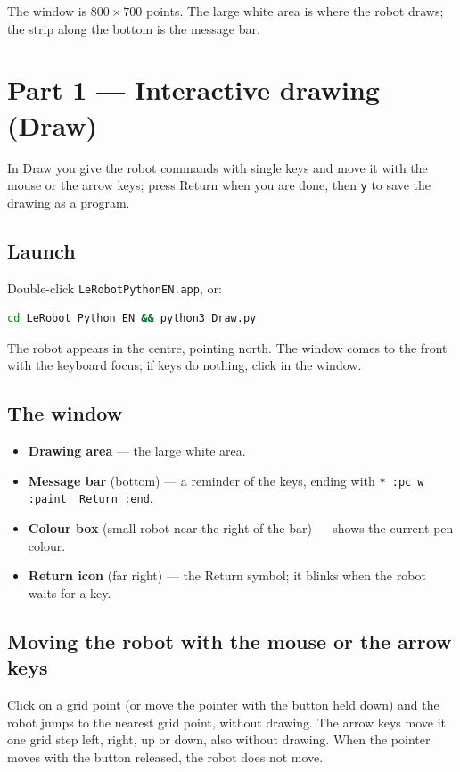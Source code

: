 \documentclass[11pt,a4paper]{article}
\newcommand{\kbd}[1]{\texttt{#1}}
\begin{document}
The window is $800 \times 700$ points. The large white area is where the
robot draws; the strip along the bottom is the message bar.

\section{Part 1 --- Interactive drawing (Draw)}

In Draw you give the robot commands with single keys and move it with
the mouse or the arrow keys; press Return when you are done, then \kbd{y} to
save the drawing as a program.

\subsection{Launch}
Double-click \kbd{LeRobotPythonEN.app}, or:
\begin{lstlisting}[language=bash]
cd LeRobot_Python_EN && python3 Draw.py
\end{lstlisting}
The robot appears in the centre, pointing north. The window comes to the
front with the keyboard focus; if keys do nothing, click in the window.

\subsection{The window}
\begin{itemize}
\item \textbf{Drawing area} --- the large white area.
\item \textbf{Message bar} (bottom) --- a reminder of the keys, ending with
  \kbd{* :pc w :paint\ \ Return :end}.
\item \textbf{Colour box} (small robot near the right of the bar) --- shows
  the current pen colour.
\item \textbf{Return icon} (far right) --- the Return symbol; it blinks when
  the robot waits for a key.
\end{itemize}

\subsection{Moving the robot with the mouse or the arrow keys}
Click on a grid point (or move the pointer with the button held down) and
the robot jumps to the nearest grid point, without drawing. The arrow keys
move it one grid step left, right, up or down, also without drawing. When
the pointer moves with the button released, the robot does not move.
\end{document}
